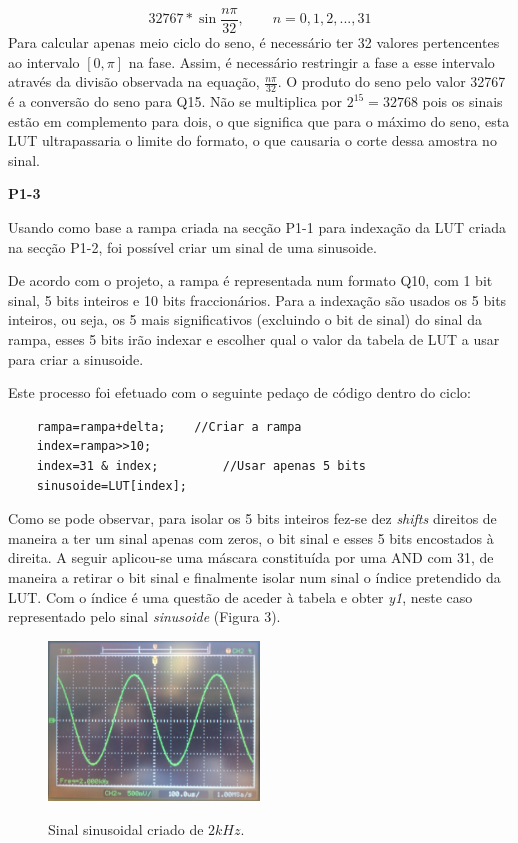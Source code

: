 \documentclass[11pt]{article}
\begin{document}
\begin{equation}
32767*\sin \dfrac{n \pi}{32},  \quad \quad n=0,1,2,...,31
\end{equation}
Para calcular apenas meio ciclo do seno, é necessário ter 32 valores pertencentes ao intervalo $[0,\pi]$ na fase. Assim, é necessário restringir a fase a esse intervalo através da divisão observada na equação, $\frac{n \pi}{32}$. O produto do seno pelo valor 32767 é a conversão do seno para Q15. Não se multiplica por $2 ^{15}=32768$ pois os sinais estão em complemento para dois, o que significa que para o máximo do seno, esta LUT ultrapassaria o limite do formato, o que causaria o corte dessa amostra no sinal.
\vspace{2 mm}

\textbf{P1-3}
\label{para:P1-3}

Usando como base a rampa criada na secção P1-1 para indexação da LUT criada na secção P1-2, foi possível criar um sinal de uma sinusoide.

De acordo com o projeto, a rampa é representada num formato Q10, com 1 bit sinal, 5 bits inteiros e 10 bits fraccionários. 
Para a indexação são usados os 5 bits inteiros, ou seja, os 5 mais significativos (excluindo o bit de sinal) do sinal da rampa, esses 5 bits irão indexar e escolher qual o valor da tabela de LUT a usar para criar a sinusoide. 

Este processo foi efetuado com o seguinte pedaço de código dentro do ciclo:

\begin{lstlisting}
	rampa=rampa+delta;    //Criar a rampa
	index=rampa>>10;
	index=31 & index;         //Usar apenas 5 bits
	sinusoide=LUT[index];
\end{lstlisting}

Como se pode observar, para isolar os 5 bits inteiros fez-se dez \textit{shifts} direitos de maneira a ter um sinal apenas com zeros, o bit sinal e esses 5 bits encostados à direita. A seguir aplicou-se uma máscara constituída por uma AND com 31, de maneira a retirar o bit sinal e finalmente isolar num sinal o índice pretendido da LUT. Com o índice é uma questão de aceder à tabela e obter \textit{y1}, neste caso representado pelo sinal \textit{sinusoide} (Figura 3).

\begin{figure}[H]
	\centering
	\includegraphics[width=0.5\textwidth]{./P1_1seno}~\\
	\caption{Sinal sinusoidal criado de $ 2 kHz $.}
\end{figure}
\end{document}
